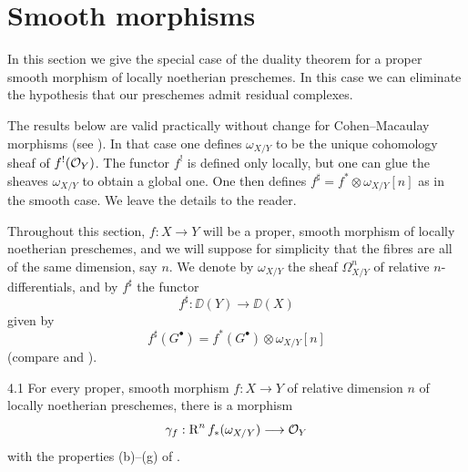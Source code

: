 \section{Smooth morphisms}\label{sec:7.4}

In this section we give the special case of the duality theorem for a proper smooth morphism of locally noetherian preschemes. In this case we can eliminate the hypothesis that our preschemes admit residual complexes.

The results below are valid practically without change for Cohen--Macaulay morphisms (see ). In that case one defines $\omega_{X/Y}$ to be the unique cohomology sheaf of $f^{!}(\mathcal{O}_{Y})$. The functor $f^{!}$ is defined only locally, but one can glue the sheaves $\omega_{X/Y}$ to obtain a global one. One then defines $f^{\sharp} = f^{*} \otimes \omega_{X/Y}[n]$ as in the smooth case. We leave the details to the reader.

Throughout this section, $f: X \to Y$ will be a proper, smooth morphism of locally noetherian preschemes, and we will suppose for simplicity that the fibres are all of the same dimension, say $n$. We denote by $\omega_{X/Y}$ the sheaf $\Omega_{X/Y}^{n}$ of relative $n$-differentials, and by $f^{\sharp}$ the functor
\[
f^{\sharp}: \DD(Y) \longrightarrow \DD(X)
\]
given by
\[
f^{\sharp}(G^{\bullet}) = f^{*}(G^{\bullet}) \otimes \omega_{X/Y}[n]
\]
(compare  and ).

\begin{booktheorem}{4.1}\label{thm:7.4.1}
For every proper, smooth morphism $f: X \to Y$ of relative dimension $n$ of locally noetherian preschemes, there is a morphism
\[
\gamma_{f}: \operatorname{R}^{n} f_{*}(\omega_{X/Y}) \longrightarrow \mathcal{O}_{Y}
\]
with the properties (b)--(g) of .
\end{booktheorem}

